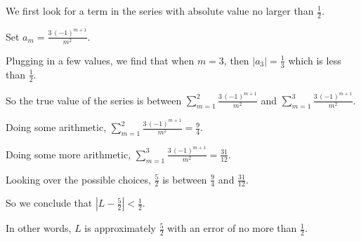 \documentclass{ximera}
\begin{document}
\begin{question}
  \begin{solution}
    \begin{hint}
      We first look for a term in the series with absolute value no larger than \(\displaystyle\frac{1}{2}\).
    \end{hint}
    \begin{hint}
      Set \(a_{m} = \displaystyle\frac{3 \, \left(-1\right)^{m + 1}}{m^{2}}\).
    \end{hint}
    \begin{hint}
      Plugging in a few values, we find that when \(m = 3\), then \(|a_{3}| = \displaystyle\frac{1}{3}\) which is less than \(\displaystyle\frac{1}{2}\).
    \end{hint}
    \begin{hint}
      So the true value of the series is between \(\displaystyle\sum_{m = 1}^{2} \displaystyle\frac{3 \, \left(-1\right)^{m + 1}}{m^{2}}\) and \(\displaystyle\sum_{m = 1}^{3} \displaystyle\frac{3 \, \left(-1\right)^{m + 1}}{m^{2}}\).
    \end{hint}
    \begin{hint}
      Doing some arithmetic, \(\displaystyle\sum_{m = 1}^{2} \displaystyle\frac{3 \, \left(-1\right)^{m + 1}}{m^{2}} = \displaystyle\frac{9}{4}\).
    \end{hint}
    \begin{hint}
      Doing some more arithmetic, \(\displaystyle\sum_{m = 1}^{3} \displaystyle\frac{3 \, \left(-1\right)^{m + 1}}{m^{2}} = \displaystyle\frac{31}{12}\).
    \end{hint}
    \begin{hint}
      Looking over the possible choices, \(\displaystyle\frac{5}{2}\) is between \(\displaystyle\frac{9}{4}\) and \(\displaystyle\frac{31}{12}\).
    \end{hint}
    \begin{hint}
      So we conclude that \(\left| L - \displaystyle\frac{5}{2} \right| < \displaystyle\frac{1}{2}\).
    \end{hint}
    \begin{hint}
      In other words, \(L\) is approximately \(\displaystyle\frac{5}{2}\) with an error of no more than \(\displaystyle\frac{1}{2}\).
    \end{hint}


    \begin{multiple-choice}
    \end{multiple-choice}

  \end{solution}
\end{question}
\end{document}
